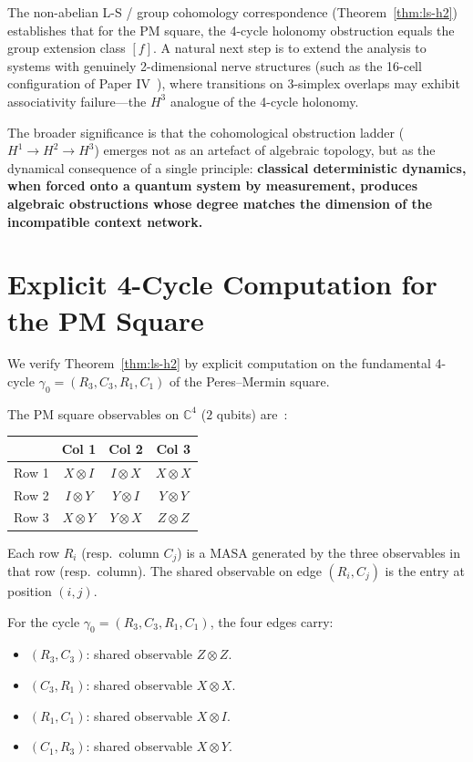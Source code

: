 \documentclass[11pt]{article}
\begin{document}
The non-abelian L-S / group cohomology correspondence (Theorem~\ref{thm:ls-h2})
establishes that for the PM square, the 4-cycle holonomy obstruction equals the
group extension class $[f]$. A natural next step is to extend the analysis to
systems with genuinely 2-dimensional nerve structures (such as the 16-cell
configuration of Paper IV~\cite{PaperIV}), where transitions on 3-simplex
overlaps may exhibit associativity failure---the $H^3$ analogue of the 4-cycle
holonomy.

The broader significance is that the cohomological obstruction ladder
($H^1 \to H^2 \to H^3$) emerges not as an artefact of algebraic topology,
but as the dynamical consequence of a single principle: \textbf{classical
deterministic dynamics, when forced onto a quantum system by measurement,
produces algebraic obstructions whose degree matches the dimension of the
incompatible context network.}

\appendix
\section{Explicit 4-Cycle Computation for the PM Square}
\label{app:explicit-4cycle}

We verify Theorem~\ref{thm:ls-h2} by explicit computation on the fundamental
4-cycle $\gamma_0 = (R_3, C_3, R_1, C_1)$ of the Peres--Mermin square.

The PM square observables on $\mathbb{C}^4$ ($2$ qubits) are~\cite{Peres90,Mermin90}:
\begin{center}
\begin{tabular}{lccc}
\toprule
& Col 1 & Col 2 & Col 3 \\
\midrule
Row 1 & $X \otimes I$ & $I \otimes X$ & $X \otimes X$ \\
Row 2 & $I \otimes Y$ & $Y \otimes I$ & $Y \otimes Y$ \\
Row 3 & $X \otimes Y$ & $Y \otimes X$ & $Z \otimes Z$ \\
\bottomrule
\end{tabular}
\end{center}

Each row $R_i$ (resp.\ column $C_j$) is a MASA generated by the three
observables in that row (resp.\ column). The shared observable on edge
$(R_i, C_j)$ is the entry at position $(i,j)$.

For the cycle $\gamma_0 = (R_3, C_3, R_1, C_1)$, the four edges carry:
\begin{itemize}
  \item $(R_3, C_3)$: shared observable $Z \otimes Z$.
  \item $(C_3, R_1)$: shared observable $X \otimes X$.
  \item $(R_1, C_1)$: shared observable $X \otimes I$.
  \item $(C_1, R_3)$: shared observable $X \otimes Y$.
\end{itemize}
\end{document}

